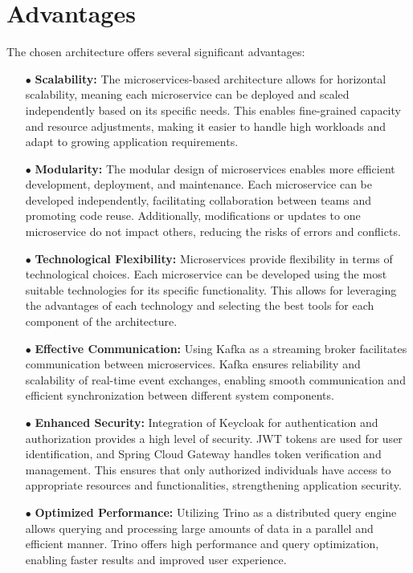\section{Advantages}

The chosen architecture offers several significant advantages:

\begin{enumerate}
\item[$\bullet$] \textbf{Scalability:} The microservices-based architecture allows for horizontal scalability, meaning each microservice can be deployed and scaled independently based on its specific needs. This enables fine-grained capacity and resource adjustments, making it easier to handle high workloads and adapt to growing application requirements.
\item[$\bullet$] \textbf{Modularity:} The modular design of microservices enables more efficient development, deployment, and maintenance. Each microservice can be developed independently, facilitating collaboration between teams and promoting code reuse. Additionally, modifications or updates to one microservice do not impact others, reducing the risks of errors and conflicts.
\item[$\bullet$] \textbf{Technological Flexibility:} Microservices provide flexibility in terms of technological choices. Each microservice can be developed using the most suitable technologies for its specific functionality. This allows for leveraging the advantages of each technology and selecting the best tools for each component of the architecture.
\item[$\bullet$] \textbf{Effective Communication:} Using Kafka as a streaming broker facilitates communication between microservices. Kafka ensures reliability and scalability of real-time event exchanges, enabling smooth communication and efficient synchronization between different system components.
\item[$\bullet$] \textbf{Enhanced Security:} Integration of Keycloak for authentication and authorization provides a high level of security. JWT tokens are used for user identification, and Spring Cloud Gateway handles token verification and management. This ensures that only authorized individuals have access to appropriate resources and functionalities, strengthening application security.
\item[$\bullet$] \textbf{Optimized Performance:} Utilizing Trino as a distributed query engine allows querying and processing large amounts of data in a parallel and efficient manner. Trino offers high performance and query optimization, enabling faster results and improved user experience.
\end{enumerate}

